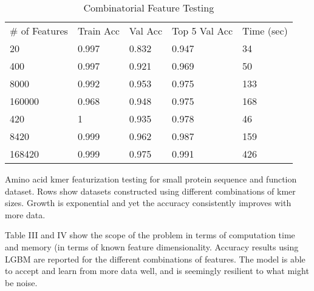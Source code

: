 \begin{table}[ht!]
\centering
\caption{Combinatorial Feature Testing}
\bigbreak
\label{comb_feat}
\begin{tabular}{lllll}
\# of Features & Train Acc & Val Acc & Top 5 Val Acc & Time (sec) \\
20             & 0.997     & 0.832   & 0.947         & 34         \\
400            & 0.997     & 0.921   & 0.969         & 50         \\
8000           & 0.992     & 0.953   & 0.975         & 133        \\
160000         & 0.968     & 0.948   & 0.975         & 168        \\
420            & 1         & 0.935   & 0.978         & 46         \\
8420           & 0.999     & 0.962   & 0.987         & 159        \\
168420         & 0.999     & 0.975   & 0.991         & 426        \\
\end{tabular}
\bigbreak
\footnotesize Amino acid kmer featurization testing for small protein sequence and function dataset. Rows show datasets constructed using different combinations of kmer sizes. Growth is exponential and yet the accuracy consistently improves with more data.
\end{table}

Table III and IV show the scope of the problem in terms of computation time and memory (in terms of known feature dimensionality. Accuracy results using LGBM are reported for the different combinations of features. The model is able to accept and learn from more data well, and is seemingly resilient to what might be noise.
